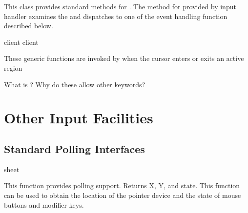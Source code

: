 {

This class provides standard methods for .  The method for
 provided by input handler examines the  and
dispatches to one of the event handling function described below.

 {client \key \allow}
 {client \key \allow}

These generic functions are invoked by  when the cursor enters or
exits an active region

 {What is ?  Why do these allow other keywords?}

\chapter {Other Input Facilities}

\section {Standard Polling Interfaces}

 {sheet}

This function provides polling support.  Returns X, Y, and state.  This function
can be used to obtain the location of the pointer device and the state of mouse
buttons and modifier keys.

} %
